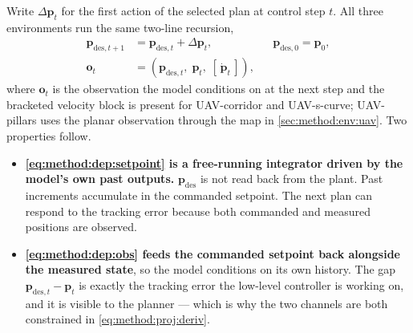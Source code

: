 \documentclass[headsepline,footsepline,footinclude=false,oneside,fontsize=11pt,paper=a4,listof=totoc,bibliography=totoc]{scrbook}
\theoremstyle{definition}
\theoremstyle{plain}
\theoremstyle{remark}
\newcommand{\vect}[1]{\boldsymbol{#1}}
\newcommand{\sidx}[1]{_{\textrm{#1}}}
\begin{document}
Write $\Delta\vect{p}_{t}$ for the first action of the selected plan at control step $t$. All three
environments run the same two-line recursion,
\begin{align}
  \vect{p}_{\textrm{des},t+1} &= \vect{p}_{\textrm{des},t} + \Delta\vect{p}_{t},
    &&\vect{p}_{\textrm{des},0} = \vect{p}_{0},
    \label{eq:method:dep:setpoint}\\
  \vect{o}_{t} &= \left(\vect{p}_{\textrm{des},t},\;\vect{p}_{t},\;[\,\dot{\vect{p}}_{t}\,]\right),
    \label{eq:method:dep:obs}
\end{align}
where $\vect{o}_{t}$ is the observation the model conditions on at the next step and the bracketed
velocity block is present for UAV-corridor and UAV-s-curve; UAV-pillars uses the planar
observation through the map in \autoref{sec:method:env:uav}. Two properties follow.

\begin{itemize}
  \item \textbf{\eqref{eq:method:dep:setpoint} is a free-running integrator driven by the model's own
    past outputs.} $\vect{p}\sidx{des}$ is not read back from the plant. Past increments accumulate in the commanded setpoint. The next plan can respond to the
    tracking error because both commanded and measured positions are observed.
  \item \textbf{\eqref{eq:method:dep:obs} feeds the commanded setpoint back alongside the measured
    state}, so the model conditions on its own history. The gap
    $\vect{p}_{\textrm{des},t} - \vect{p}_{t}$ is exactly the tracking error the low-level controller is
    working on, and it is visible to the planner --- which is why the two channels are both
    constrained in \eqref{eq:method:proj:deriv}.
\end{itemize}
\end{document}
